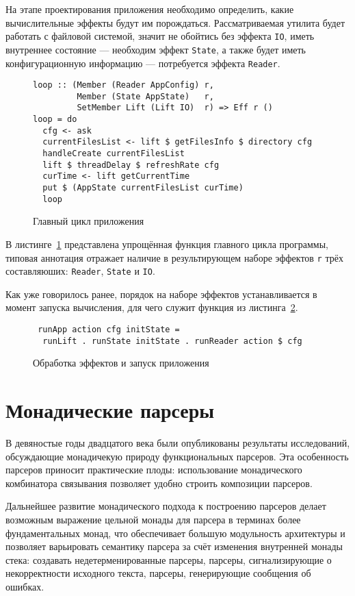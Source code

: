 На этапе проектирования приложения необходимо определить, какие вычислительные эффекты будут им порождаться. Рассматриваемая утилита будет работать с файловой системой, значит не обойтись без эффекта \lstinline{IO}, иметь внутреннее состояние --- необходим эффект \lstinline{State}, а также будет иметь конфигурационную информацию --- потребуется эффекта \lstinline{Reader}.

\begin{figure}[t]
\begin{lstlisting}
loop :: (Member (Reader AppConfig) r, 
         Member (State AppState)   r, 
         SetMember Lift (Lift IO)  r) => Eff r ()
loop = do
  cfg <- ask 
  currentFilesList <- lift $ getFilesInfo $ directory cfg
  handleCreate currentFilesList
  lift $ threadDelay $ refreshRate cfg
  curTime <- lift getCurrentTime
  put $ (AppState currentFilesList curTime)
  loop
\end{lstlisting}
\caption{Главный цикл приложения}
\label{listing:ftMainLoop}
\end{figure}

В листинге~\ref{listing:ftMainLoop} представлена упрощённая функция главного цикла программы, типовая аннотация отражает наличие в результирующем наборе эффектов \lstinline{r} трёх составляюших: \lstinline{Reader}, \lstinline{State} и \lstinline{IO}.

Как уже говорилось ранее, порядок на наборе эффектов устанавливается в момент запуска вычисления, для чего служит функция из листинга~\ref{listing:ftRun}.

\begin{figure}[t]
\begin{lstlisting}
 runApp action cfg initState = 
  runLift . runState initState . runReader action $ cfg
\end{lstlisting}
\caption{Обработка эффектов и запуск приложения}
\label{listing:ftRun}
\end{figure}

\section{Монадические парсеры}

В девяностые годы двадцатого века были опубликованы результаты исследований, обсуждающие монадичекую природу функциональных парсеров. Эта особенность парсеров приносит практические плоды: использование монадического комбинатора связывания позволяет удобно строить композиции парсеров. 

Дальнейшее развитие монадического подхода к построению парсеров делает возможным выражение цельной монады для парсера в терминах более фундаментальных монад, что обеспечивает большую модульность архитектуры и позволяет варьировать семантику парсера за счёт изменения внутренней монады стека: создавать недетерменированные парсеры, парсеры, сигнализирующие о некорректности исходного текста, парсеры, генерирующие сообщения об ошибках.

